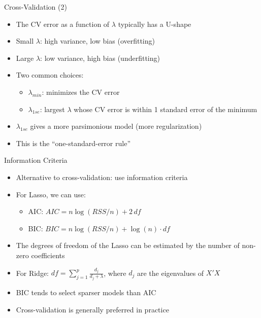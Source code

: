 \documentclass[aspectratio=169]{beamer}
\begin{document}
\begin{frame}{Cross-Validation (2)}
\begin{itemize}
    \item The CV error as a function of $\lambda$ typically has a U-shape
    \item Small $\lambda$: high variance, low bias (overfitting)
    \item Large $\lambda$: low variance, high bias (underfitting)
    \item Two common choices:
    \begin{itemize}
        \item $\lambda_{min}$: minimizes the CV error
        \item $\lambda_{1se}$: largest $\lambda$ whose CV error is within 1 standard error of the minimum
    \end{itemize}
    \item $\lambda_{1se}$ gives a more parsimonious model (more regularization)
    \item This is the ``one-standard-error rule''
\end{itemize}
\end{frame}

\begin{frame}{Information Criteria}
\begin{itemize}
    \item Alternative to cross-validation: use information criteria
    \item For Lasso, we can use:
    \begin{itemize}
        \item AIC: $AIC = n \log(RSS/n) + 2\,df$
        \item BIC: $BIC = n \log(RSS/n) + \log(n) \cdot df$
    \end{itemize}
    \item The degrees of freedom of the Lasso can be estimated by the number of non-zero coefficients
    \item For Ridge: $df = \sum_{j=1}^{p} \frac{d_j}{d_j + \lambda}$, where $d_j$ are the eigenvalues of $X'X$
    \item BIC tends to select sparser models than AIC
    \item Cross-validation is generally preferred in practice
\end{itemize}
\end{frame}

\end{document}
